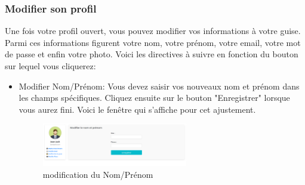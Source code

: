 \documentclass[12pt]{article}
\begin{document}
\subsubsection{Modifier son profil}
Une fois votre profil ouvert, vous pouvez modifier vos informations à votre guise. Parmi ces informations figurent votre nom, votre prénom, votre email, votre mot de passe et enfin votre photo. Voici les directives à suivre en fonction du bouton sur lequel vous cliquerez:
\medskip
\begin{itemize}
\item Modifier Nom/Prénom: Vous devez saisir vos nouveaux nom et prénom dans les champs spécifiques. Cliquez ensuite sur le bouton "Enregistrer" lorsque vous aurez fini. Voici le fenêtre qui s'affiche pour cet ajustement.
    \begin{figure}[h!]
        \centering
        \includegraphics[width=0.6\textwidth]{./images/modify-profile-name.png}
        \caption{modification du Nom/Prénom}
        \label{fig:modification du Nom/Prénom}
    \end{figure}


\end{itemize}
\end{document}
